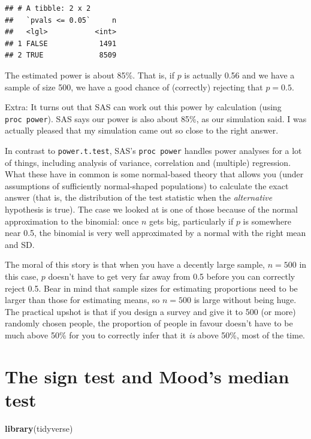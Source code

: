 \documentclass[]{tufte-book}
\newenvironment{Shaded}{}{}
\newcommand{\KeywordTok}[1]{\textcolor[rgb]{0.00,0.44,0.13}{\textbf{#1}}}
\newcommand{\NormalTok}[1]{#1}
\theoremstyle{definition}
\theoremstyle{definition}
\theoremstyle{definition}
\theoremstyle{remark}
\begin{document}
\begin{verbatim}
## # A tibble: 2 x 2
##   `pvals <= 0.05`     n
##   <lgl>           <int>
## 1 FALSE            1491
## 2 TRUE             8509
\end{verbatim}

The estimated power is about 85\%. That is, if \(p\) is actually 0.56
and we have a sample of size 500, we have a good chance of (correctly)
rejecting that \(p=0.5\).

Extra: It turns out that SAS can work out this power by calculation
(using \texttt{proc\ power}). SAS says our power is also about 85\%, as
our simulation said. I was actually pleased that my simulation came out
so close to the right answer.

In contrast to \texttt{power.t.test}, SAS's \texttt{proc\ power} handles
power analyses for a lot of things, including analysis of variance,
correlation and (multiple) regression. What these have in common is some
normal-based theory that allows you (under assumptions of sufficiently
normal-shaped populations) to calculate the exact answer (that is, the
distribution of the test statistic when the \emph{alternative}
hypothesis is true). The case we looked at is one of those because of
the normal approximation to the binomial: once \(n\) gets big,
particularly if \(p\) is somewhere near 0.5, the binomial is very well
approximated by a normal with the right mean and SD.

The moral of this story is that when you have a decently large sample,
\(n=500\) in this case, \(p\) doesn't have to get very far away from 0.5
before you can correctly reject 0.5. Bear in mind that sample sizes for
estimating proportions need to be larger than those for estimating
means, so \(n=500\) is large without being huge. The practical upshot is
that if you design a survey and give it to 500 (or more) randomly chosen
people, the proportion of people in favour doesn't have to be much above
50\% for you to correctly infer that it \emph{is} above 50\%, most of
the time.

\hypertarget{the-sign-test-and-moods-median-test}{%
\chapter{The sign test and Mood's median
test}\label{the-sign-test-and-moods-median-test}}

\begin{Shaded}
\begin{Highlighting}[]
\KeywordTok{library}\NormalTok{(tidyverse)}
\end{Highlighting}
\end{Shaded}
\end{document}
